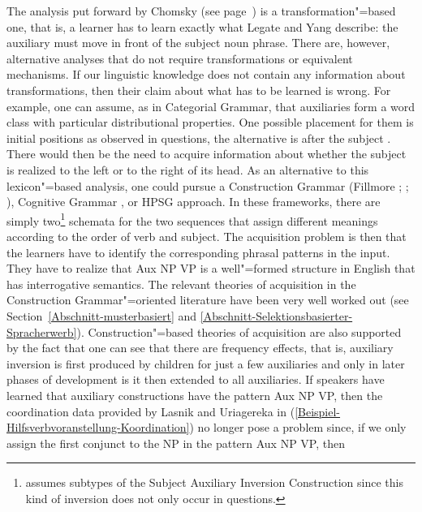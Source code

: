 \noindent
The analysis put forward by Chomsky (see page~\pageref{Seite-GB-Entscheidungsfragen-Englisch}) is a transformation"=based one, that is, a learner
has to learn exactly what Legate and Yang describe: the auxiliary must move in front of the subject noun phrase. There are, however, alternative analyses that
do not require transformations or equivalent mechanisms.
If our linguistic knowledge does not contain any information about transformations, then their claim about what has to be learned is wrong.
For example, one can assume, as in Categorial Grammar, that auxiliaries form a word class with particular distributional properties.
One possible placement for them is initial positions as observed in questions, the alternative is after the subject \citep[]{Villavicencio2002a}.
There would then be the need to acquire information about whether the subject is realized to the
left or to the right of its head. As an alternative to this lexicon"=based analysis,
one could pursue a Construction Grammar (Fillmore \citeyear[]{Fillmore88a};
\citeyear{Fillmore99a}; \citealp[]{KF99a}), Cognitive Grammar \citep[Chapter~9]{Dabrowska2004a}, or HPSG\indexhpsg \citep{GSag2000a-u,Sag2020a} approach.
In these frameworks, there are simply two\footnote{%
	\citet{Fillmore99a} assumes subtypes of the Subject Auxiliary Inversion Construction since this kind of inversion does not
	only occur in questions.
}
schemata for the two sequences that assign different meanings according to the order of verb and subject. The acquisition problem is then that the learners have
to identify the corresponding phrasal patterns in the input. They have to realize that Aux NP VP is a well"=formed structure in English that has interrogative
semantics.
The relevant theories of acquisition in the Construction Grammar"=oriented literature have been very well worked out (see Section~\ref{Abschnitt-musterbasiert} and
\ref{Abschnitt-Selektionsbasierter-Spracherwerb}). Construction"=based theories of acquisition are also supported by the fact that one can see that there are
frequency effects, that is, auxiliary inversion is first produced by children for just a few auxiliaries and only in later phases of development is it then extended to
all auxiliaries. If speakers have learned that auxiliary constructions have the pattern Aux NP VP, then the coordination data provided by Lasnik and Uriagereka in 
(\ref{Beispiel-Hilfsverbvoranstellung-Koordination}) no longer pose a problem since, if we only assign the first conjunct to the NP in the pattern Aux NP VP, then
